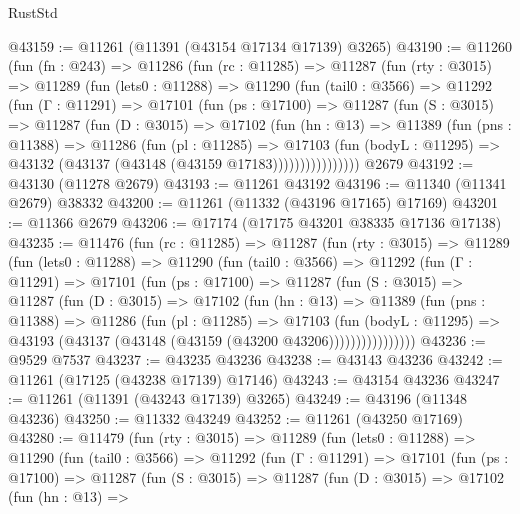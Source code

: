 \begin{lexlean}{RustStd}
\begin{coremodule}
@43159 := @11261 (@11391 (@43154 @17134 @17139) @3265)
@43190 := @11260
    (fun (fn : @243) =>
    @11286
      (fun (rc : @11285) =>
      @11287
        (fun (rty : @3015) =>
        @11289
          (fun (lets0 : @11288) =>
          @11290
            (fun (tail0 : @3566) =>
            @11292
              (fun (Γ : @11291) =>
              @17101
                (fun (ps : @17100) =>
                @11287
                  (fun (S : @3015) =>
                  @11287
                    (fun (D : @3015) =>
                    @17102
                      (fun (hn : @13) =>
                      @11389
                        (fun (pns : @11388) =>
                        @11286
                          (fun (pl : @11285) =>
                          @17103
                            (fun (bodyL : @11295) =>
                            @43132 (@43137 (@43148 (@43159 @17183))))))))))))))))
    @2679
@43192 := @43130 (@11278 @2679)
@43193 := @11261 @43192
@43196 := @11340 (@11341 @2679) @38332
@43200 := @11261 (@11332 (@43196 @17165) @17169)
@43201 := @11366 @2679
@43206 := @17174 (@17175 @43201 @38335 @17136 @17138)
@43235 := @11476
    (fun (rc : @11285) =>
    @11287
      (fun (rty : @3015) =>
      @11289
        (fun (lets0 : @11288) =>
        @11290
          (fun (tail0 : @3566) =>
          @11292
            (fun (Γ : @11291) =>
            @17101
              (fun (ps : @17100) =>
              @11287
                (fun (S : @3015) =>
                @11287
                  (fun (D : @3015) =>
                  @17102
                    (fun (hn : @13) =>
                    @11389
                      (fun (pns : @11388) =>
                      @11286
                        (fun (pl : @11285) =>
                        @17103
                          (fun (bodyL : @11295) =>
                          @43193 (@43137 (@43148 (@43159 (@43200 @43206))))))))))))))))
@43236 := @9529 @7537
@43237 := @43235 @43236
@43238 := @43143 @43236
@43242 := @11261 (@17125 (@43238 @17139) @17146)
@43243 := @43154 @43236
@43247 := @11261 (@11391 (@43243 @17139) @3265)
@43249 := @43196 (@11348 @43236)
@43250 := @11332 @43249
@43252 := @11261 (@43250 @17169)
@43280 := @11479
    (fun (rty : @3015) =>
    @11289
      (fun (lets0 : @11288) =>
      @11290
        (fun (tail0 : @3566) =>
        @11292
          (fun (Γ : @11291) =>
          @17101
            (fun (ps : @17100) =>
            @11287
              (fun (S : @3015) =>
              @11287
                (fun (D : @3015) =>
                @17102
                  (fun (hn : @13) =>

\end{coremodule}
\end{lexlean}
